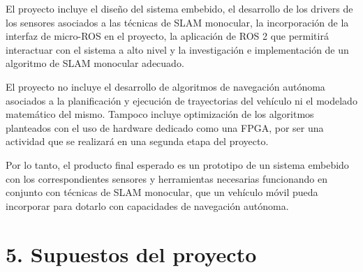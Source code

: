 \documentclass[
11pt, %
codirector, %
]{charter}
\begin{document}





El proyecto incluye el diseño del sistema embebido, el desarrollo de los drivers de los sensores asociados a las técnicas de SLAM monocular, la incorporación de la interfaz de micro-ROS en el proyecto, la aplicación de ROS 2 que permitirá interactuar con el sistema a alto nivel y la investigación e implementación de un algoritmo de SLAM monocular adecuado.

El proyecto no incluye el desarrollo de algoritmos de navegación autónoma asociados a la planificación y ejecución de trayectorias del vehículo ni el modelado matemático del mismo. Tampoco incluye optimización de los algoritmos planteados con el uso de hardware dedicado como una FPGA, por ser una actividad que se realizará en una segunda etapa del proyecto.

Por lo tanto, el producto final esperado es un prototipo de un sistema embebido con los correspondientes sensores y herramientas necesarias funcionando en conjunto con técnicas de SLAM monocular, que un vehículo móvil pueda incorporar para dotarlo con capacidades de navegación autónoma.

\section{5. Supuestos del proyecto}
\label{sec:supuestos}



\end{document}
